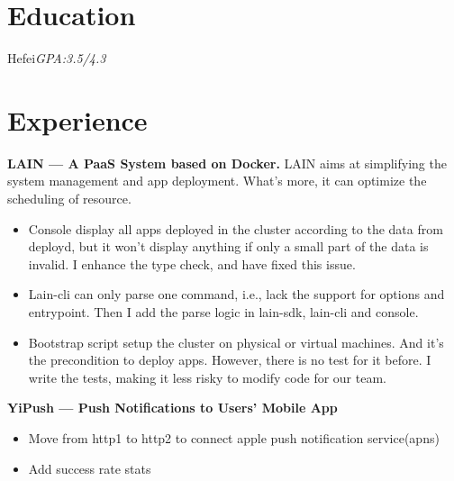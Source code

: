 \documentclass[11pt,a4paper,sans]{moderncv}
\begin{document}
\maketitle

\section{Education}


          {Hefei}{\textit{GPA:3.5/4.3}}{}


\section{Experience}

          {\textbf{LAIN --- A PaaS System based on Docker.}
            LAIN aims at simplifying the system management and app deployment.
            What's more, it can optimize the scheduling of resource.
            \begin{itemize}
            \item Console display all apps deployed in the cluster according to the data from deployd,
              but it won't display anything if only a small part of the data is invalid.
              I enhance the type check, and have fixed this issue.
            \item Lain-cli can only parse one command, i.e., lack the support for options and entrypoint.
              Then I add the parse logic in lain-sdk, lain-cli and console.
            \item Bootstrap script setup the cluster on physical or virtual machines.
              And it's the precondition to deploy apps. However, there is no test for it before.
              I write the tests, making it less risky to modify code for our team.
            \end{itemize}
          }

          {\textbf{YiPush --- Push Notifications to Users' Mobile App}
            \begin{itemize}
              \item Move from http1 to http2 to connect apple push notification service(apns)
              \item Add success rate stats
            \end{itemize}
          }
\end{document}
